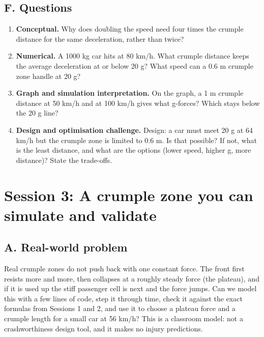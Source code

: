 \documentclass[11pt,a4paper]{article}
\begin{document}
\subsection*{F. Questions}
\begin{enumerate}[nosep]
\item \textbf{Conceptual.} Why does doubling the speed need four times the crumple distance for the same deceleration, rather than twice?
\item \textbf{Numerical.} A 1000 kg car hits at 80 km/h. What crumple distance keeps the average deceleration at or below 20 g? What speed can a 0.6 m crumple zone handle at 20 g?
\item \textbf{Graph and simulation interpretation.} On the graph, a 1 m crumple distance at 50 km/h and at 100 km/h gives what g-forces? Which stays below the 20 g line?
\item \textbf{Design and optimisation challenge.} Design: a car must meet 20 g at 64 km/h but the crumple zone is limited to 0.6 m. Is that possible? If not, what is the least distance, and what are the options (lower speed, higher g, more distance)? State the trade-offs.
\end{enumerate}

\section{Session 3: A crumple zone you can simulate and validate}

\subsection*{A. Real-world problem}
Real crumple zones do not push back with one constant force. The front first resists more and more, then collapses at a roughly steady force (the plateau), and if it is used up the stiff passenger cell is next and the force jumps. Can we model this with a few lines of code, step it through time, check it against the exact formulas from Sessions 1 and 2, and use it to choose a plateau force and a crumple length for a small car at 56 km/h? This is a classroom model: not a crashworthiness design tool, and it makes no injury predictions.
\end{document}
